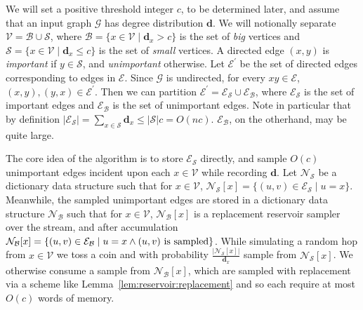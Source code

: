 \documentclass{report}
\begin{document}
We will set a positive threshold integer $c$, to be determined later, and assume that an input graph $\mathcal{G}$ has degree distribution $\mathbf{d}$. 
We will notionally separate $\mathcal{V} = \mathcal{B} \cup \mathcal{S}$, where $\mathcal{B} = \{x \in \mathcal{V} \mid \mathbf{d}_x > c \}$ is the set of \emph{big} vertices and $\mathcal{S} = \{x \in \mathcal{V} \mid \mathbf{d}_x \leq c\}$ is the set of \emph{small} vertices.
A directed edge $(x, y)$ is \emph{important} if $y \in \mathcal{S}$, and \emph{unimportant} otherwise.
Let $\mathcal{E}^\prime$ be the set of directed edges corresponding to edges in $\mathcal{E}$. 
Since $\mathcal{G}$ is undirected, for every $xy \in \mathcal{E}$, $(x, y), (y, x) \in \mathcal{E}^\prime$.
Then we can partition $\mathcal{E}^\prime = \mathcal{E}_\mathcal{S} \cup \mathcal{E}_\mathcal{B}$, where $\mathcal{E}_\mathcal{S}$ is the set of important edges and $\mathcal{E}_\mathcal{B}$ is the set of unimportant edges. 
Note in particular that by definition $|\mathcal{E}_\mathcal{S}| = \sum_{x \in \mathcal{S}} \mathbf{d}_x \leq |\mathcal{S}|c = O(nc)$.
$\mathcal{E}_\mathcal{B}$, on the otherhand, may be quite large.

The core idea of the algorithm is to store $\mathcal{E}_\mathcal{S}$ directly, and sample $O(c)$ unimportant edges incident upon each $x \in \mathcal{V}$ while recording $\mathbf{d}$.
Let $\mathcal{N}_\mathcal{S}$ be a dictionary data structure such that for $x \in \mathcal{V}$, $\mathcal{N}_\mathcal{S}[x] = \{(u, v) \in \mathcal{E}_\mathcal{S} \mid u = x \}$.
Meanwhile, the sampled unimportant edges are stored in a dictionary data structure $\mathcal{N}_\mathcal{B}$ such that for $x \in \mathcal{V}$, $\mathcal{N}_\mathcal{B}[x]$ is a replacement reservoir sampler over the stream, and after accumulation  $\mathcal{N}_\mathcal{B}[x]= \{(u, v) \in \mathcal{E}_\mathcal{B} \mid u = x \wedge \textnormal{$(u, v)$ is sampled} \}$.
While simulating a random hop from $x \in \mathcal{V}$ we toss a coin and with probability $\frac{|\mathcal{N}_\mathcal{S}[x]|}{\mathbf{d}_x}$ sample from $\mathcal{N}_\mathcal{S}[x]$.
We otherwise consume a sample from $\mathcal{N}_\mathcal{B}[x]$, which are sampled with replacement via a scheme like Lemma~\ref{lem:reservoir:replacement} and so each require at most $O(c)$ words of memory.
\end{document}
